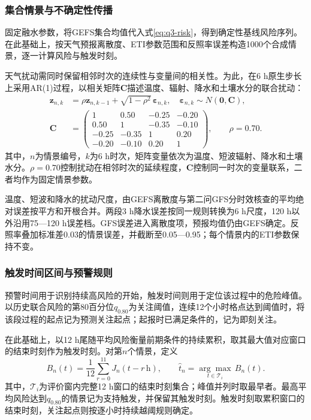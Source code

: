 \subsubsection{集合情景与不确定性传播}
固定融水参数，将GEFS集合均值代入式\eqref{eq:q3-risk}，得到确定性基线风险序列。在此基础上，按天气预报离散度、ETI参数范围和反照率误差构造1000个合成情景，逐一计算风险与触发时刻。

天气扰动需同时保留相邻时次的连续性与变量间的相关性。为此，在6 h原生步长上采用AR(1)过程，以相关矩阵$\boldsymbol C$描述温度、辐射、降水和土壤水分的联合扰动：
\begin{equation}
 \begin{aligned}
 \boldsymbol z_{n,k}&=\rho\boldsymbol z_{n,k-1}
       +\sqrt{1-\rho^2}\,\boldsymbol\varepsilon_{n,k},
       \quad\boldsymbol\varepsilon_{n,k}\sim N(\boldsymbol0,\boldsymbol C),\\
 \boldsymbol C&=\begin{pmatrix}
 1&0.50&-0.25&-0.20\\
 0.50&1&-0.35&-0.10\\
 -0.25&-0.35&1&0.20\\
 -0.20&-0.10&0.20&1
 \end{pmatrix},\qquad \rho=0.70.
 \end{aligned}
 \label{eq:q3-ar}
\end{equation}
其中，$n$为情景编号，$k$为6 h时次，矩阵变量依次为温度、短波辐射、降水和土壤水分。$\rho=0.70$控制扰动在相邻时次的延续程度，$\boldsymbol C$控制同一时次的变量联系，二者均作为固定情景参数。

温度、短波和降水的扰动尺度，由GEFS离散度与第二问GFS分时效核查的平均绝对误差按平方和开根合并。两段3 h降水误差按同一规则转换为6 h尺度，120 h以外沿用75—120 h误差档。GFS误差进入离散度项，预报均值仍由GEFS确定。反照率叠加标准差0.03的情景误差，并截断至0.05—0.95；每个情景内的ETI参数保持不变。

\subsubsection{触发时间区间与预警规则}
预警时间用于识别持续高风险的开始，触发时间则用于定位该过程中的危险峰值。以历史联合风险的第80百分位$q_{0.80}$为关注阈值，连续12个小时格点达到阈值时，将该段过程的起点记为预测关注起点；起报时已满足条件的，记为即刻关注。

在此基础上，以12 h尾随平均风险衡量前期条件的持续累积，取其最大值对应窗口的结束时刻作为触发时刻。对第$n$个情景，定义
\begin{equation}
 B_n(t)=\frac{1}{12}\sum_{r=0}^{11}J_n(t-r\,\mathrm{h}),
 \qquad
 \widehat t_n=\underset{t\in\mathcal T_i}{\arg\max}\, B_n(t).
 \label{eq:q3-trigger}
\end{equation}
其中，$\mathcal T_i$为评价窗内完整12 h窗口的结束时刻集合；峰值并列时取最早者。最高平均风险达到$q_{0.80}$的情景记为支持触发，并保留其触发时刻。触发时刻取累积窗口的结束时刻，关注起点则按逐小时持续越阈规则确定。

